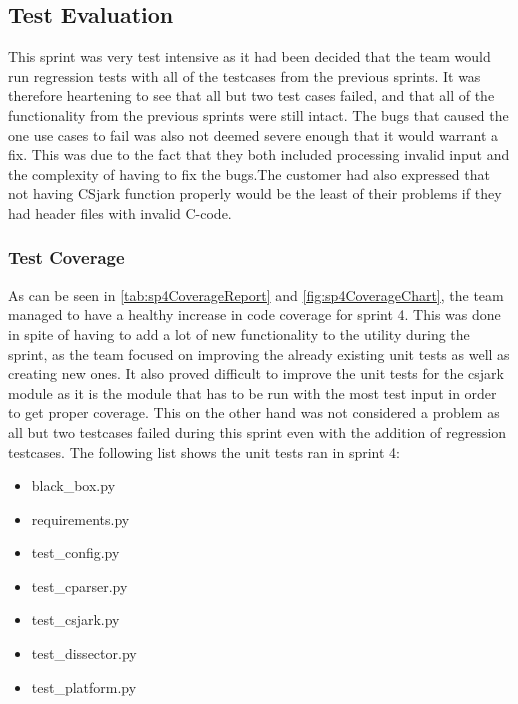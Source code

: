 \subsection{Test Evaluation}
This sprint was very test intensive as it had been decided that the team would run regression tests with all of the testcases from the previous sprints. It was therefore heartening to see that all but two test cases failed, and that all of the functionality from the previous sprints were still intact. The bugs that caused the one use cases to fail was also not deemed severe enough that it would warrant a fix. This was due to the fact that they both included processing invalid input and the complexity of having to fix the bugs.The customer had also expressed that not having CSjark function properly would be the least of their problems if they had header files with invalid C-code. 

\subsubsection{Test Coverage}
As can be seen in \autoref{tab:sp4CoverageReport} and \autoref{fig:sp4CoverageChart}, the team managed to have a healthy increase in code coverage for sprint 4. This was done in spite of having to add a lot of new functionality to the utility during the sprint, as the team focused on improving the already existing unit tests as well as creating new ones. It also proved difficult to improve the unit tests for the csjark module as it is the module that has to be run with the most test input in order to get proper coverage. This on the other hand was not considered a problem as all but two testcases failed during this sprint even with the addition of regression testcases. The following list shows the unit tests ran in sprint 4:

\begin{itemize}
	\item black\_box.py
	\item requirements.py
	\item test\_config.py
	\item test\_cparser.py
	\item test\_csjark.py
	\item test\_dissector.py
	\item test\_platform.py
\end{itemize}

